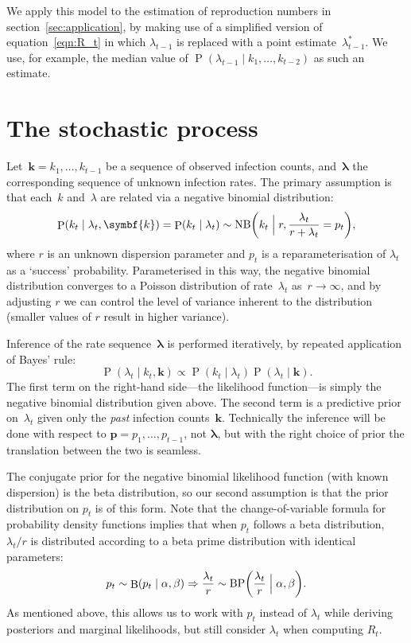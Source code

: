 \documentclass[12pt,a4paper]{article}
\newcommand\ub[1]{\symbf{#1}}                 %
\DeclareMathOperator\Pb{P}                    %
\DeclarePairedDelimiter\lr{\lparen}{\rparen}  %
\DeclareMathOperator\B{B}                     %
\DeclareMathOperator\BP{BP}                   %
\DeclareMathOperator\NB{NB}                   %
\begin{document}
We apply this model to the estimation of reproduction numbers in
section~\ref{sec:application}, by making use of a simplified version of
equation~\eqref{eqn:R_t} in which $\lambda_{t-1}$ is replaced with a point
estimate~$\lambda_{t-1}^*$. We use, for example, the median value of
$\Pb(\lambda_{t-1} \mid k_1, \dots, k_{t-2})$ as such an estimate.

\section{The stochastic process} %

Let~$\ub{k} = k_1, \dots, k_{t-1}$ be a sequence of observed infection counts,
and~$\ub{\lambda}$ the corresponding sequence of unknown infection rates. The
primary assumption is that each~$k$ and~$\lambda$ are related via a negative
binomial distribution:
\begin{equation}\label{eqn:likelihood}
  \Pb(k_t \mid \lambda_t, \ub{k}) = \Pb(k_t \mid \lambda_t)
  \sim \NB\lr*{k_t \Bigm\vert r, \frac{\lambda_t}{r + \lambda_t} = p_t},
\end{equation}
where $r$ is an unknown dispersion parameter and $p_t$ is a reparameterisation
of $\lambda_t$ as a `success' probability. Parameterised in this way, the
negative binomial distribution converges to a Poisson distribution of
rate~$\lambda_t$ as~$r \to \infty$, and by adjusting $r$ we can control the
level of variance inherent to the distribution (smaller values of $r$ result in
higher variance).

Inference of the rate sequence~$\ub{\lambda}$ is performed iteratively, by
repeated application of Bayes' rule:
\begin{equation*}
  \Pb(\lambda_t \mid k_t, \ub{k}) \propto \Pb(k_t \mid \lambda_t)
    \Pb(\lambda_t \mid \ub{k}).
\end{equation*}
The first term on the right-hand side---the likelihood function---is simply the
negative binomial distribution given above. The second term is a predictive
prior on~$\lambda_t$ given only the \emph{past} infection counts~$\ub{k}$.
Technically the inference will be done with respect to $\ub{p} = p_1, \dots,
p_{t-1}$, not $\ub{\lambda}$, but with the right choice of prior the translation
between the two is seamless.

The conjugate prior for the negative binomial likelihood function (with known
dispersion) is the beta distribution, so our second assumption is that the prior
distribution on $p_t$ is of this form. Note that the change-of-variable formula
for probability density functions implies that when $p_t$ follows a beta
distribution, $\lambda_t/r$ is distributed according to a beta prime
distribution with identical parameters:
\begin{equation*}
  p_t \sim \B(p_t \mid \alpha, \beta)
  \Rightarrow \frac{\lambda_t}{r}
    \sim \BP\lr*{\frac{\lambda_t}{r} \Bigm\vert \alpha, \beta}.
\end{equation*}
As mentioned above, this allows us to work with $p_t$ instead of $\lambda_t$
while deriving posteriors and marginal likelihoods, but still consider
$\lambda_t$ when computing $R_t$.
\end{document}
